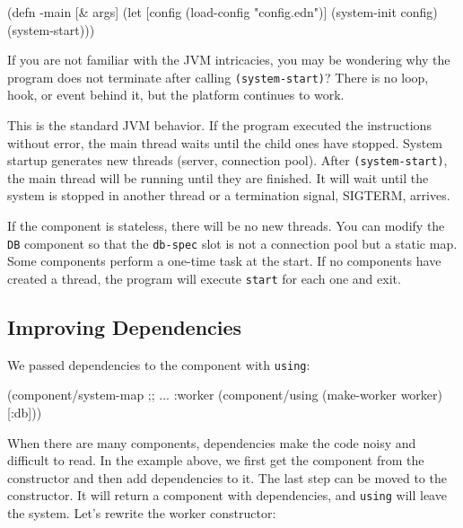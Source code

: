 \else

\begin{english}
  \begin{clojure}
(defn -main [& args]
  (let [config (load-config "config.edn")]
    (system-init config)
    (system-start)))
  \end{clojure}
\end{english}

\fi

If you are not familiar with the JVM intricacies, you may be wondering why the program does not terminate after calling \verb|(system-start)|? There is no loop, hook, or event behind it, but the platform continues to work.


This is the standard JVM behavior. If the program executed the instructions without error, the main thread waits until the child ones have stopped. System startup generates new threads (server, connection pool). After \verb|(system-start)|, the main thread will be running until they are finished. It will wait until the system is stopped in another thread or a termination signal, SIGTERM, arrives.

If the component is stateless, there will be no new threads. You can modify the \verb|DB| component so that the \verb|db-spec| slot is not a connection pool but a static map. Some components perform a one-time task at the start. If no components have created a thread, the program will execute \verb|start| for each one and exit.

\subsection{Improving Dependencies}


We passed dependencies to the component with \verb|using|:

\begin{english}
  \begin{clojure}
(component/system-map
 ;; ...
 :worker (component/using
          (make-worker worker) [:db]))
  \end{clojure}
\end{english}

When there are many components, dependencies make the code noisy and difficult to read. In the example above, we first get the component from the constructor and then add dependencies to it. The last step can be moved to the constructor. It will return a component with dependencies, and \verb|using| will leave the system. Let's rewrite the worker constructor:

